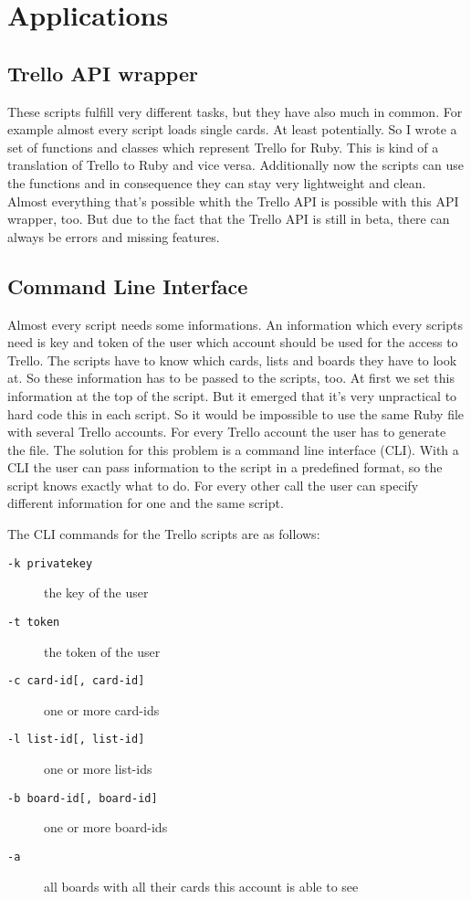 
\chapter{Applications}

\section{Trello API wrapper}
These scripts fulfill very different tasks, but they have also much in common. For example almost every script loads single cards. At least potentially. So I wrote a set of functions and classes which represent Trello for Ruby. This is kind of a translation of Trello to Ruby and vice versa. Additionally now the scripts can use the functions and in consequence they can stay very lightweight and clean. Almost everything that's possible whith the Trello API is possible with this API wrapper, too. But due to the fact that the Trello API is still in beta, there can always be errors and missing features.

\section{Command Line Interface}
Almost every script needs some informations. An information which every scripts need is key and token of the user which account should be used for the access to Trello. The scripts have to know which cards, lists and boards they have to look at. So these information has to be passed to the scripts, too. At first we set this information at the top of the script. But it emerged that it's very unpractical to hard code this in each script. So it would be impossible to use the same Ruby file with several Trello accounts. For every Trello account the user has to generate the file. The solution for this problem is a command line interface (CLI). With a CLI the user can pass information to the script in a predefined format, so the script knows exactly what to do. For every other call the user can specify different information for one and the same script.

The CLI commands for the Trello scripts are as follows:
\begin{description}
	\item[\texttt{-k privatekey}] the key of the user
	\item[\texttt{-t token}] the token of the user
	\item[\texttt{-c card-id[, card-id]}] one or more card-ids
	\item[\texttt{-l list-id[, list-id]}] one or more list-ids
	\item[\texttt{-b board-id[, board-id]}] one or more board-ids
	\item[\texttt{-a}] all boards with all their cards this account is able to see
\end{description}


